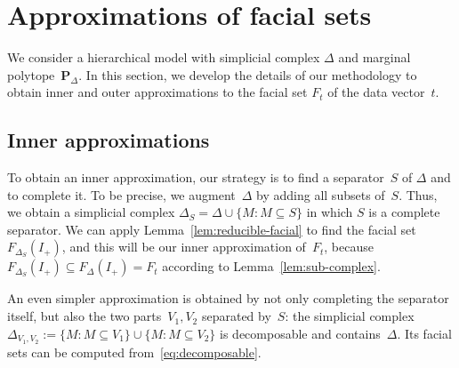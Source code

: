 \documentclass[aos,noinfoline]{imsart}
\newcommand{\face}{F}
\newcommand{\Pbf}{\mathbf{P}}
\theoremstyle{remark}
\theoremstyle{definition}
\begin{document}
\section{Approximations of facial sets}
\label{sec:facial-sets}

We consider a hierarchical model with simplicial complex $\Delta$ and marginal polytope~$\Pbf_{\Delta}$.  In this
section, we develop the details of our methodology to obtain inner and outer approximations to the facial set $F_t$ of
the data vector~$t$.

\subsection{Inner approximations}
\label{sec:inner-approximations}

To obtain an inner approximation, our strategy is to find a separator~$S$ of $\Delta$ and to complete it.  To be
precise, we augment~$\Delta$ by adding all subsets of~$S$.  Thus, we obtain a simplicial complex
$\Delta_{S}=\Delta\cup\{M : M\subseteq S\}$ in which $S$ is a complete separator.  We can apply
Lemma~\ref{lem:reducible-facial} to find the facial set $\face_{\Delta_{S}}(I_{+})$, and this will be our inner
approximation of~$\face_{t}$, because $\face_{\Delta_{S}}(I_{+})\subseteq\face_{\Delta}(I_{+})  =\face_{t}$ according to
  Lemma~\ref{lem:sub-complex}.

An even simpler approximation is obtained by not only completing the separator itself, but also the two
parts~$V_{1},V_{2}$ separated by~$S$: the simplicial complex
$\Delta_{V_{1},V_{2}} := \{M : M\subseteq V_{1}\}\cup\{M:M\subseteq V_{2}\}$ is decomposable and contains~$\Delta$.  Its
facial sets can be computed from~\eqref{eq:decomposable}.
\end{document}
